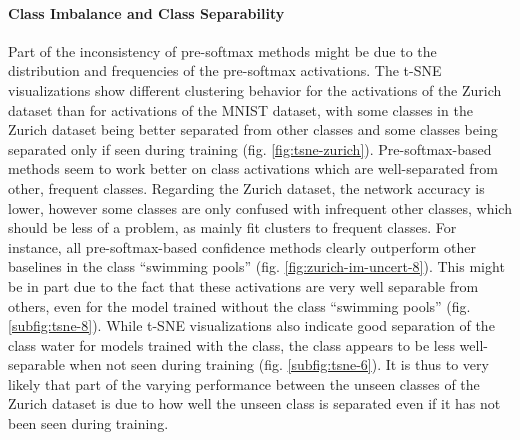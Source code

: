 \documentclass[10pt]{article}
\begin{document}
\paragraph{Class Imbalance and Class Separability} Part of the inconsistency of pre-softmax methods might be due to the distribution and frequencies of the pre-softmax activations. The \gls{t-SNE} visualizations show different clustering behavior for the activations of the Zurich dataset than for activations of the \gls{MNIST} dataset, with some classes in the Zurich dataset being better separated from other classes and some classes being separated only if seen during training (fig. \ref{fig:tsne-zurich}). Pre-softmax-based methods seem to work better on class activations which are well-separated from other, frequent classes. Regarding the Zurich dataset, the network accuracy is lower, however some classes are only confused with infrequent other classes, which should be less of a problem, as  mainly fit clusters to frequent classes. For instance, all pre-softmax-based confidence methods clearly outperform other baselines in the class ``swimming pools'' (fig. \ref{fig:zurich-im-uncert-8}). This might be in part due to the fact that these activations are very well separable from others, even for the model trained without the class ``swimming pools'' (fig. \ref{subfig:tsne-8}). While \gls{t-SNE} visualizations also indicate good separation of the class water for models trained with the class, the class appears to be less well-separable when not seen during training (fig. \ref{subfig:tsne-6}). It is thus to very likely that part of the varying performance between the unseen classes of the Zurich dataset is due to how well the unseen class is separated even if it has not been seen during training.

\end{document}
